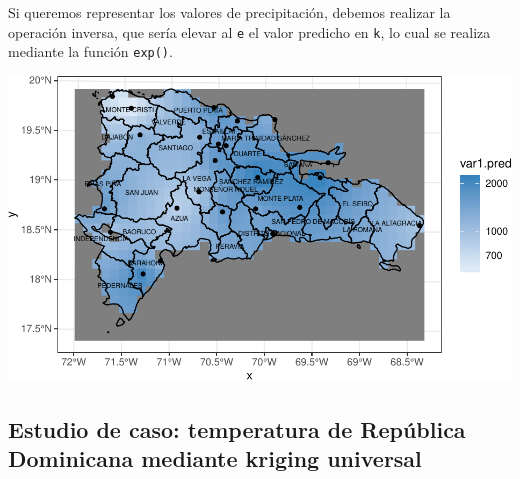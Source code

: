 \documentclass[11pt,]{article}
\newenvironment{Shaded}{\begin{snugshade}}{\end{snugshade}}
\newcommand{\KeywordTok}[1]{\textcolor[rgb]{0.13,0.29,0.53}{\textbf{#1}}}
\newcommand{\DataTypeTok}[1]{\textcolor[rgb]{0.13,0.29,0.53}{#1}}
\newcommand{\DecValTok}[1]{\textcolor[rgb]{0.00,0.00,0.81}{#1}}
\newcommand{\StringTok}[1]{\textcolor[rgb]{0.31,0.60,0.02}{#1}}
\newcommand{\OperatorTok}[1]{\textcolor[rgb]{0.81,0.36,0.00}{\textbf{#1}}}
\newcommand{\NormalTok}[1]{#1}
\begin{document}
Si queremos representar los valores de precipitación, debemos realizar
la operación inversa, que sería elevar al \texttt{e} el valor predicho
en \texttt{k}, lo cual se realiza mediante la función \texttt{exp()}.

\begin{Shaded}
\end{Shaded}

\includegraphics{Proyecto-Precipitaciones_files/figure-latex/krige-1.pdf}

\subsection{Estudio de caso: temperatura de República Dominicana
mediante kriging
universal}\label{estudio-de-caso-temperatura-de-repuxfablica-dominicana-mediante-kriging-universal}
\end{document}
